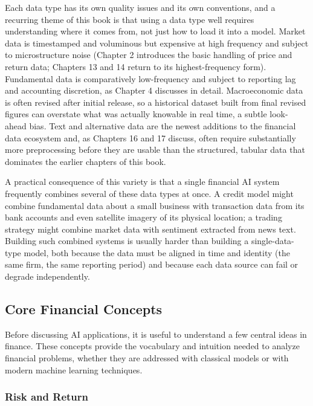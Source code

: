 \documentclass[../ai_in_finance]{subfiles}
\begin{document}
Each data type has its own quality issues and its own conventions, and a recurring theme of this book is that using a data type well requires understanding where it comes from, not just how to load it into a model. Market data is timestamped and voluminous but expensive at high frequency and subject to microstructure noise (Chapter 2 introduces the basic handling of price and return data; Chapters 13 and 14 return to its highest-frequency form). Fundamental data is comparatively low-frequency and subject to reporting lag and accounting discretion, as Chapter 4 discusses in detail.
Macroeconomic data is often revised after initial release, so a historical dataset built from final revised figures can overstate what was actually knowable in real time, a subtle look-ahead bias. Text and alternative data are the newest additions to the financial data ecosystem and, as Chapters 16 and 17 discuss, often require substantially more preprocessing before they are usable than the structured, tabular data that dominates the earlier chapters of this book.

A practical consequence of this variety is that a single financial AI system frequently combines several of these data types at once. A credit model might combine fundamental data about a small business with transaction data from its bank accounts and even satellite imagery of its physical location; a trading strategy might combine market data with sentiment extracted from news text. Building such combined systems is usually harder than building a single-data-type model, both because the data must be aligned in time and identity (the same firm, the same reporting period) and because each data source can fail or degrade independently.

\subsection{Core Financial Concepts}

Before discussing AI applications, it is useful to understand a few central ideas in finance. These concepts provide the vocabulary and intuition needed to analyze financial problems, whether they are addressed with classical models or with modern machine learning techniques.

\subsubsection*{Risk and Return}
\end{document}
